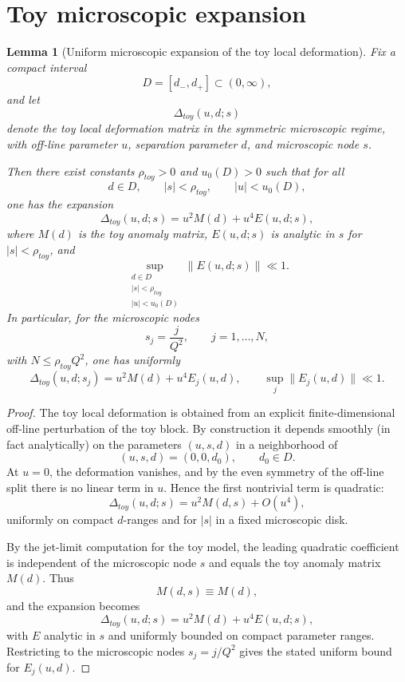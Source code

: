 \documentclass[11pt,a4paper]{amsart}
\def\toy{toy}%
\theoremstyle{plain}
\newtheorem{lemma}[theorem]{Lemma}
\theoremstyle{definition}
\newcommand{\toy}{\mathrm{toy}}
\begin{document}
\section{Toy microscopic expansion}
\label{app:toy-microscopic-expansion}

\begin{lemma}[Uniform microscopic expansion of the toy local deformation]
\label{lem:toy-microscopic-expansion}
Fix a compact interval
\[
D=[d_-,d_+]\subset(0,\infty),
\]
and let
\[
\Delta_{\toy}(u,d;s)
\]
denote the toy local deformation matrix in the symmetric microscopic regime,
with off-line parameter $u$, separation parameter $d$, and microscopic node
$s$.

Then there exist constants $\rho_{\toy}>0$ and $u_0(D)>0$ such that for all
\[
d\in D,
\qquad
|s|<\rho_{\toy},
\qquad
|u|<u_0(D),
\]
one has the expansion
\[
\Delta_{\toy}(u,d;s)=u^2M(d)+u^4E(u,d;s),
\]
where $M(d)$ is the toy anomaly matrix, $E(u,d;s)$ is analytic in $s$
for $|s|<\rho_{\toy}$, and
\[
\sup_{\substack{d\in D\\ |s|<\rho_{\toy}\\ |u|<u_0(D)}} \|E(u,d;s)\|\ll 1.
\]
In particular, for the microscopic nodes
\[
s_j=\frac{j}{Q^2},
\qquad
j=1,\dots,N,
\]
with $N\le \rho_{\toy}Q^2$, one has uniformly
\[
\Delta_{\toy}(u,d;s_j)=u^2M(d)+u^4E_j(u,d),
\qquad
\sup_j \|E_j(u,d)\|\ll 1.
\]
\end{lemma}

\begin{proof}
The toy local deformation is obtained from an explicit finite-dimensional
off-line perturbation of the toy block. By construction it depends smoothly
(in fact analytically) on the parameters $(u,s,d)$ in a neighborhood of
\[
(u,s,d)=(0,0,d_0),
\qquad d_0\in D.
\]
At $u=0$, the deformation vanishes, and by the even symmetry of the off-line
split there is no linear term in $u$. Hence the first nontrivial term is
quadratic:
\[
\Delta_{\toy}(u,d;s)=u^2M(d,s)+O(u^4),
\]
uniformly on compact $d$-ranges and for $|s|$ in a fixed microscopic disk.

By the jet-limit computation for the toy model, the leading quadratic
coefficient is independent of the microscopic node $s$ and equals the toy
anomaly matrix $M(d)$. Thus
\[
M(d,s)\equiv M(d),
\]
and the expansion becomes
\[
\Delta_{\toy}(u,d;s)=u^2M(d)+u^4E(u,d;s),
\]
with $E$ analytic in $s$ and uniformly bounded on compact parameter
ranges. Restricting to the microscopic nodes $s_j=j/Q^2$ gives the stated
uniform bound for $E_j(u,d)$.
\end{proof}
\end{document}

